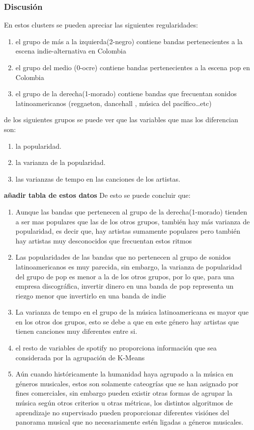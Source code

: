 \documentclass[11pt]{article}
\begin{document}
\subsubsection{Discusión}
\label{sec:orgc1c6af5}
En estos clusters se pueden apreciar las siguientes regularidades:
\begin{enumerate}
\item el grupo de más a la izquierda(2-negro) contiene bandas pertenecientes a la escena indie-alternativa en Colombia
\item el grupo del medio (0-ocre) contiene bandas pertenecientes a la escena pop en Colombia
\item el grupo de la derecha(1-morado) contiene bandas que frecuentan sonidos latinoamericanos (reggaeton, dancehall , música del pacífico\ldots{}etc)
\end{enumerate}

de los siguientes grupos se puede ver que las variables que mas los diferencian son:
\begin{enumerate}
\item la popularidad.
\item la varianza de la popularidad.
\item las varianzas de tempo en las canciones de los artistas.
\end{enumerate}

\textbf{añadir tabla de estos datos}
De esto se puede concluir que:
\begin{enumerate}
\item Aunque las bandas que pertenecen al grupo de la derecha(1-morado) tienden a ser mas populares que las de los otros grupos, también hay más varianza de popularidad, es decir que, hay artistas sumamente populares pero también hay artistas muy desconocidos que frecuentan estos ritmos
\item Las popularidades de las bandas que no pertenecen al grupo de sonidos latinoamericanos es muy parecida, sin embargo, la varianza de popularidad del grupo de pop es menor a la de los otros grupos, por lo que, para una empresa discográfica, invertir dinero en una banda de pop representa un riezgo menor que invertirlo en una banda de indie
\item La varianza de tempo en el grupo de la música latinoamericana es mayor que en los otros dos grupos, esto se debe a que en este género hay artistas que tienen canciones muy diferentes entre si.
\item el resto de variables de spotify no proporciona información que sea considerada por la agrupación de K-Means
\item Aún cuando históricamente la humanidad haya agrupado a la música en géneros musicales, estos son solamente cateogrías que se han asignado por fines comerciales, sin embargo pueden existir otras formas de agrupar la música según otros criterios u otras métricas, los distintos algoritmos de aprendizaje no supervisado pueden proporcionar diferentes visiónes del panorama musical que no necesariamente estén ligadas a géneros musicales.
\end{enumerate}
\end{document}
